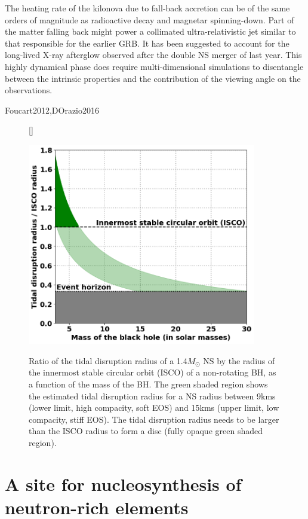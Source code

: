 \documentclass[12pt,onecolumn]{article}
\makeatletter
\newcommand{\grb}{GRB\xspace}
\newcommand{\eos}{EOS\xspace}
\newcommand*{\ns}{NS\@\xspace}
\newcommand*{\bh}{BH\@\xspace}
\newcommand*{\msun}{$M_{\odot}$\@\xspace}
\makeatother
\begin{document}
The heating rate of the kilonova due to fall-back accretion can be of the same orders of magnitude as radioactive decay and magnetar spinning-down. Part of the matter falling back might power a collimated ultra-relativistic jet similar to that responsible for the earlier \grb. It has been suggested to account for the long-lived X-ray afterglow observed after the double \ns merger of last year. This highly dynamical phase does require multi-dimensional simulations to disentangle between the intrinsic properties and the contribution of the viewing angle on the observations.

Foucart2012,DOrazio2016


\begin{figure}[!b]
\vspace*{-0.2cm}
[\FBwidth]
{\caption{Ratio of the tidal disruption radius of a 1.4\msun \ns by the radius of the innermost stable circular orbit (ISCO) of a non-rotating \bh, as a function of the mass of the \bh. The green shaded region shows the estimated tidal disruption radius for a \ns radius between 9kms (lower limit, high compacity, soft \eos) and 15kms (upper limit, low compacity, stiff \eos). The tidal disruption radius needs to be larger than the ISCO radius to form a disc (fully opaque green shaded region).}\label{fig:spinning_down}}
{\includegraphics[width=10cm]{Figures/tidal_disruption_radius.png}}
\end{figure}

\section{A site for nucleosynthesis of neutron-rich elements}
\end{document}
